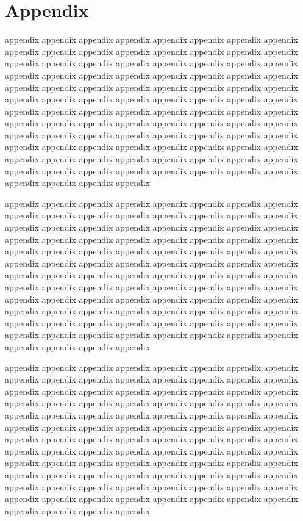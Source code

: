 \documentclass[platex,ja=standard,12pt,a4paper,twoside,onecolumn,fleqn,dvipdfmx,english]{bxjsbook}
\begin{document}
\chapter{Appendix}
appendix appendix appendix appendix appendix appendix appendix appendix appendix appendix appendix appendix appendix appendix appendix appendix appendix appendix appendix appendix appendix appendix appendix appendix appendix appendix appendix appendix appendix appendix appendix appendix appendix appendix appendix appendix appendix appendix appendix appendix appendix appendix appendix appendix appendix appendix appendix appendix appendix appendix appendix appendix appendix appendix appendix appendix appendix appendix appendix appendix appendix appendix appendix appendix appendix appendix appendix appendix appendix appendix appendix appendix appendix appendix appendix appendix appendix appendix appendix appendix appendix appendix appendix appendix appendix appendix appendix appendix appendix appendix appendix appendix appendix appendix appendix appendix appendix appendix appendix appendix

appendix appendix appendix appendix appendix appendix appendix appendix appendix appendix appendix appendix appendix appendix appendix appendix appendix appendix appendix appendix appendix appendix appendix appendix appendix appendix appendix appendix appendix appendix appendix appendix appendix appendix appendix appendix appendix appendix appendix appendix appendix appendix appendix appendix appendix appendix appendix appendix appendix appendix appendix appendix appendix appendix appendix appendix appendix appendix appendix appendix appendix appendix appendix appendix appendix appendix appendix appendix appendix appendix appendix appendix appendix appendix appendix appendix appendix appendix appendix appendix appendix appendix appendix appendix appendix appendix appendix appendix appendix appendix appendix appendix appendix appendix appendix appendix appendix appendix appendix appendix

appendix appendix appendix appendix appendix appendix appendix appendix appendix appendix appendix appendix appendix appendix appendix appendix appendix appendix appendix appendix appendix appendix appendix appendix appendix appendix appendix appendix appendix appendix appendix appendix appendix appendix appendix appendix appendix appendix appendix appendix appendix appendix appendix appendix appendix appendix appendix appendix appendix appendix appendix appendix appendix appendix appendix appendix appendix appendix appendix appendix appendix appendix appendix appendix appendix appendix appendix appendix appendix appendix appendix appendix appendix appendix appendix appendix appendix appendix appendix appendix appendix appendix appendix appendix appendix appendix appendix appendix appendix appendix appendix appendix appendix appendix appendix appendix appendix appendix appendix appendix
\end{document}
